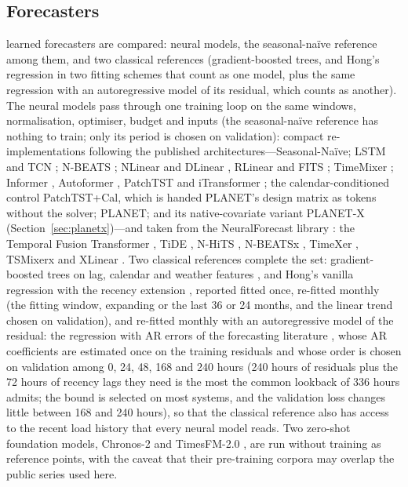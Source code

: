\subsection{Forecasters}
\label{sec:baselines}
 learned forecasters are compared:  neural models, the
seasonal-na\"ive reference among them, and two classical references (gradient-boosted trees,
and Hong's regression in two fitting schemes that count as one model, plus the same regression
with an autoregressive model of its residual, which counts as another). The neural models pass
through one training loop on the same windows, normalisation, optimiser, budget and inputs
(the seasonal-na\"ive reference has nothing to train; only its period is chosen on
validation):  compact re-implementations following the published
architectures---Seasonal-Na\"ive; LSTM \cite{kong2019lstm} and TCN \cite{bai2018tcn}; N-BEATS
\cite{oreshkin2020nbeats}; NLinear and DLinear \cite{zeng2023dlinear}, RLinear
\cite{li2023rlinear} and FITS \cite{xu2024fits}; TimeMixer \cite{wang2024timemixer}; Informer
\cite{zhou2021informer}, Autoformer \cite{wu2021autoformer}, PatchTST \cite{nie2023patchtst}
and iTransformer \cite{liu2024itransformer}; the calendar-conditioned control PatchTST+Cal,
which is handed PLANET's design matrix as tokens without the solver; PLANET; and its
native-covariate variant PLANET-X (Section~\ref{sec:planetx})---and
 taken from the NeuralForecast library \cite{neuralforecast}: the
Temporal Fusion Transformer \cite{lim2021tft}, TiDE \cite{das2023tide}, N-HiTS
\cite{challu2023nhits}, N-BEATSx \cite{olivares2023nbeatsx},
TimeXer \cite{wang2024timexer}, TSMixerx \cite{chen2023tsmixer} and XLinear
\cite{xlinear2026}. Two classical references complete the set: gradient-boosted trees on lag,
calendar and weather features \cite{friedman2001gbm}, and Hong's vanilla regression with the
recency extension \cite{hong2016gefcom,wang2016recency}, reported fitted once, re-fitted
monthly (the fitting window, expanding or the last 36 or 24 months, and the linear trend
chosen on validation), and re-fitted monthly with an autoregressive model of the residual: the
regression with AR errors of the forecasting literature \cite{hyndman2021fpp3}, whose AR
coefficients are estimated once on the training residuals and whose order is chosen on
validation among 0, 24, 48, 168 and 240 hours (240 hours of residuals plus the 72 hours of
recency lags they need is the most the common lookback of 336 hours admits; the bound is
selected on most systems, and the validation loss changes little between 168 and 240 hours),
so that the classical reference also has access to the recent load history that every neural
model reads. Two zero-shot foundation models, Chronos-2
\cite{chronos2} and TimesFM-2.0 \cite{das2024timesfm}, are run without training as reference
points, with the caveat that their pre-training corpora may overlap the public series used
here.

